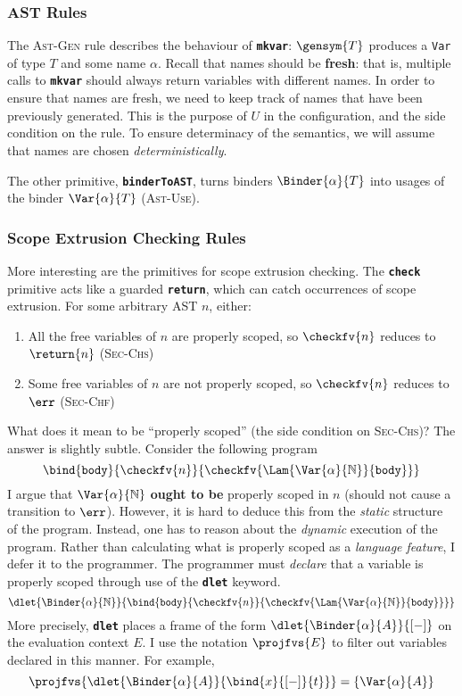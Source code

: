 \subsubsection{AST Rules}
The \textsc{Ast-Gen} rule describes the behaviour of \textbf{\texttt{mkvar}}: $\gensym{T}$ produces a \texttt{Var} of type $T$ and some name $\alpha$. Recall that names should be \textbf{fresh}: that is, multiple calls to \textbf{\texttt{mkvar}} should always return variables with different names. In order to ensure that names are fresh, we need to keep track of names that have been previously generated. This is the purpose of $U$ in the configuration, and the side condition on the rule. To ensure determinacy of the semantics, we will assume that names are chosen \textit{deterministically}.

The other primitive, \textbf{\texttt{binderToAST}}, turns binders $\Binder{\alpha}{T}$ into usages of the binder $\Var{\alpha}{T}$ (\textsc{Ast-Use}). 

\subsubsection{Scope Extrusion Checking Rules}
More interesting are the primitives for scope extrusion checking. The \textbf{\texttt{check}} primitive acts like a guarded \textbf{\texttt{return}}, which can catch occurrences of scope extrusion. For some arbitrary AST $n$, either:
\begin{enumerate}
  \item All the free variables of $n$ are properly scoped, so $\checkfv{n}$ reduces to $\return{n}$ (\textsc{Sec-Chs})
  \item Some free variables of $n$ are not properly scoped, so $\checkfv{n}$ reduces to $\err$ (\textsc{Sec-Chf})
\end{enumerate}
What does it mean to be ``properly scoped'' (the side condition on \textsc{Sec-Chs})? The answer is slightly subtle. Consider the following program 
\[\bind{\texttt{body}}{\checkfv{n}}{\checkfv{\Lam{\Var{\alpha}{\mathbb{N}}}{\texttt{body}}}}\]
I argue that $\Var{\alpha}{\mathbb{N}}$ \textbf{ought to be} properly scoped in $n$ (should not cause a transition to $\err$). However, it is hard to deduce this from the \textit{static} structure of the program. Instead, one has to reason about the \textit{dynamic} execution of the program. Rather than calculating what is properly scoped as a \textit{language feature}, I defer it to the programmer. The programmer must \textit{declare} that a variable is properly scoped through use of the \textbf{\texttt{dlet}} keyword. 
\[\dlet{\Binder{\alpha}{\mathbb{N}}}{\bind{\texttt{body}}{\checkfv{n}}{\checkfv{\Lam{\Var{\alpha}{\mathbb{N}}}{\texttt{body}}}}}\]
More precisely, \textbf{\texttt{dlet}} places a frame of the form $\dlet{\Binder{\alpha}{A}}{[-]}$ on the evaluation context $E$. I use the notation $\projfvs{E}$ to filter out variables declared in this manner. For example,
\[\projfvs{\dlet{\Binder{\alpha}{A}}{\bind{x}{[-]}{t}}} = \{ \Var{\alpha}{A} \}\]

